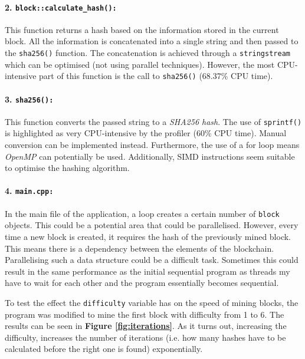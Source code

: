 \documentclass[12pt, a4paper]{article}
\begin{document}
    \paragraph{2. \texttt{block::calculate\_hash():}} This function returns a hash based on the information stored in the current block. All the information is concatenated into a single string and then passed to the \texttt{sha256()} function. The concatenation is achieved through a \texttt{stringstream} which can be optimised (not using parallel techniques). However, the most CPU-intensive part of this function is the call to \texttt{sha256()} (68.37\% CPU time). 
    \paragraph{3. \texttt{sha256():}} This function converts the passed string to a \textit{SHA256 hash}. The use of \texttt{sprintf()} is highlighted as very CPU-intensive by the profiler (60\% CPU time). Manual conversion can be implemented instead. Furthermore, the use of a for loop means \textit{OpenMP} can potentially be used. Additionally, SIMD instructions seem suitable to optimise the hashing algorithm.
    \paragraph{4. \texttt{main.cpp:}} In the main file of the application, a loop creates a certain number of \texttt{block} objects. This could be a potential area that could be parallelised. However, every time a new block is created, it requires the hash of the previously mined block. This means there is a dependency between the elements of the blockchain. Parallelising such a data structure could be a difficult task. Sometimes this could result in the same performance as the initial sequential program as threads my have to wait for each other and the program essentially becomes sequential.

    To test the effect the \texttt{difficulty} variable has on the speed of mining blocks, the program was modified to mine the first block with difficulty from 1 to 6. The results can be seen in \textbf{Figure \ref{fig:iterations}}. As it turns out, increasing the difficulty, increases the number of iterations (i.e. how many hashes have to be calculated before the right one is found) exponentially. 
\end{document}
